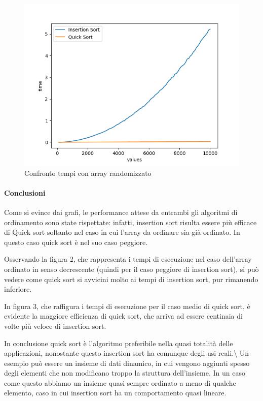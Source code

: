 \documentclass[
]{article}
\begin{document}
\begin{figure}[h!]
	\centering
	\includegraphics{../img/rand/rand_comparison10000.png}
		\caption{Confronto tempi con array randomizzato}
	\label{fig:3}
\end{figure}
\newpage


\hypertarget{conclusioni}{%
\paragraph{Conclusioni}\label{conclusioni}}

Come si evince dai grafi, le performance attese da entrambi gli
algoritmi di ordinamento sono state rispettate: infatti, insertion sort
risulta essere più efficace di Quick sort soltanto nel caso in cui
l'array da ordinare sia già ordinato. In questo caso quick sort è nel
suo caso peggiore.

Osservando la figura 2, che rappresenta i tempi di esecuzione nel caso
dell'array ordinato in senso decrescente (quindi per il caso peggiore di
insertion sort), si può vedere come quick sort si avvicini molto ai
tempi di insertion sort, pur rimanendo inferiore.

In figura 3, che raffigura i tempi di esecuzione per il caso medio di
quick sort, è evidente la maggiore efficienza di quick sort, che arriva
ad essere centinaia di volte più veloce di insertion sort.

In conclusione quick sort è l'algoritmo preferibile nella quasi totalità delle applicazioni, nonostante questo insertion sort ha comunque degli
usi reali.\textbackslash{} Un esempio può essere un insieme di dati
dinamico, in cui vengono aggiunti spesso degli elementi che non
modificano troppo la struttura dell'insieme. In un caso come questo
abbiamo un insieme quasi sempre ordinato a meno di qualche elemento,
caso in cui insertion sort ha un comportamento quasi lineare.
\end{document}
